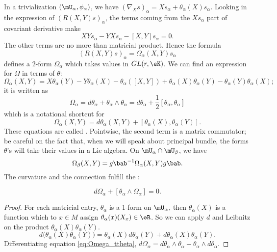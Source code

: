In a trivialization $(\mU_{\alpha},\phi_{\alpha})$, we have $(\nabla_Xs)_{\alpha}=Xs_{\alpha}+\theta_{\alpha}(X)s_{\alpha}$. Looking in the expression of $(R(X,Y)s)_{\alpha}$, the terms coming from the $Xs_{\alpha}$ part of covariant derivative make
\[
  XYs_{\alpha}-YXs_{\alpha}-[X,Y]s_{\alpha}=0.
\]
The other terms are no more than matricial product. Hence the formula
\begin{equation}
  (R(X,Y)s)_{\alpha}=\Omega_{\alpha}(X,Y)s_{\alpha}
\end{equation}
 defines a $2$-form $\Omega_{\alpha}$ which takes values in $GL(r,\eK)$. We can find an expression for $\Omega$ in terms of $\theta$:
\[
  \Omega_{\alpha}(X,Y)=X\theta_{\alpha}(Y)-Y\theta_{\alpha}(X)-\theta_{\alpha}([X,Y])+\theta_{\alpha}(X)\theta_{\alpha}(Y)-\theta_{\alpha}(Y)\theta_{\alpha}(X);
\]
it is written as
\begin{equation}\label{eq:Omega_ttheta}
\Omega_{\alpha}=d\theta_{\alpha}+\theta_{\alpha}\wedge\theta_{\alpha}=d\theta_{\alpha}+\frac{1}{2}[\theta_{\alpha},\theta_{\alpha}]
\end{equation}
which is a notational shortcut for
\begin{equation}		\label{EaCurvdVVsq}
  \Omega_{\alpha}(X,Y)=d\theta_{\alpha}(X,Y)+[\theta_{\alpha}(X),\theta_{\alpha}(Y)].
\end{equation}
These equations are called . Pointwise, the second term is a matrix commutator; be careful on the fact that, when we will speak about principal bundle, the forms $\theta$'s will take their values in a Lie algebra. On $\mU_{\alpha}\cap\mU_{\beta}$, we have
\[
  \Omega_{\beta}(X,Y)=g\bab^{-1}\Omega_{\alpha}(X,Y)g\bab.
\]
The curvature and the connection fulfill the :

\begin{lemma}
  \[
     d\Omega_{\alpha}+[\theta_{\alpha}\wedge\Omega_{\alpha}]=0.
  \]
\end{lemma}

\begin{proof}
For each matricial entry, $\theta_{\alpha}$ is a $1$-form on $\mU_{\alpha}$, then $\theta_{\alpha}(X)$ is a function which to $x\in M$ assign $\theta_{\alpha}(x)(X_x)\in\eR$. So we can apply $d$ and Leibnitz on the product $\theta_{\alpha}(X)\theta_{\alpha}(Y)$.
\[
 d\big(  \theta_{\alpha}(X)\theta_{\alpha}(Y)  \big)=\theta_{\alpha}(X)d\theta_{\alpha}(Y)+d\theta_{\alpha}(X)\theta_{\alpha}(Y).
\]
Differentiating equation \eqref{eq:Omega_ttheta}, $d\Omega_{\alpha}=d\theta_{\alpha}\wedge\theta_{\alpha}-\theta_{\alpha}\wedge d\theta_{\alpha}$.
\end{proof}

